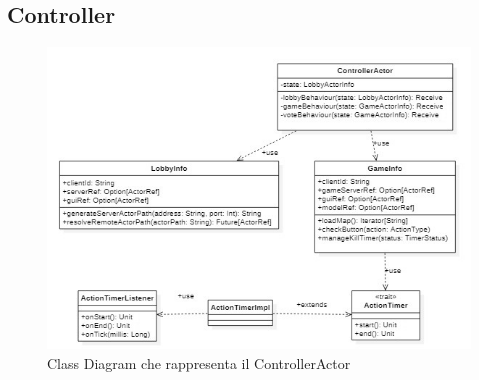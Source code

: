 \subsection{Controller}
\begin{figure}[ht]
\centering
\includegraphics[width=\textwidth, scale=0.44]{doc/report/img/Class-diagram-Controller.jpeg}
\caption{Class Diagram che rappresenta il ControllerActor}
\label{fig:ClasDiagRaprControlAct}
\end{figure}

